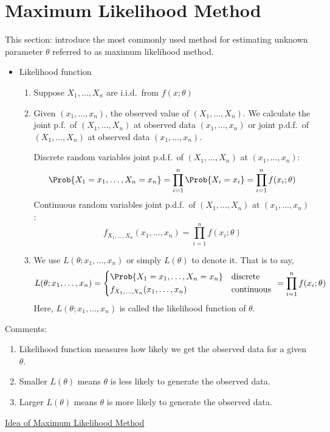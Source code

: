 \section{Maximum Likelihood Method}
This section: introduce the most commonly used method for estimating unknown
parameter $ \theta $ referred to as maximum likelihood method.
\begin{itemize}
    \item Likelihood function
          \begin{enumerate}
              \item Suppose $ X_1,\ldots,X_n $ are i.i.d.\ from $ f(x;\theta) $
              \item Given $ (x_1,\ldots,x_n) $, the observed value of $ (X_1,\ldots,X_n) $.
                    We calculate the joint p.f.\ of $ (X_1,\ldots,X_n) $ at observed
                    data $ (x_1,\ldots,x_n) $ or joint p.d.f.\ of $ (X_1,\ldots,X_n) $
                    at observed data $ (x_1,\ldots,x_n) $.

                    Discrete random variables joint p.d.f.\ of $ (X_1,\ldots,X_n) $
                    at $ (x_1,\ldots,x_n) $:
                    \[ \Prob{X_1=x_1,\ldots,X_n=x_n}=
                        \prod_{i=1}^n \Prob{X_i=x_i}=
                        \prod_{i=1}^n f(x_i;\theta) \]
                    Continuous random variables joint p.d.f.\ of $ (X_1,\ldots,X_n) $
                    at $ (x_1,\ldots,x_n) $:
                    \[ f_{X_1,\ldots,X_n}(x_1,\ldots,x_n)=
                        \prod_{i=1}^n f(x_i;\theta) \]
              \item We use $ L(\theta;x_1,\ldots,x_n) $ or simply
                    $ L(\theta) $ to denote it. That is to say,
                    \[ L(\theta;x_1,\ldots,x_n)=
                        \begin{cases*}
                            \Prob{X_1=x_1,\ldots,X_n=x_n} & discrete\\
                            f_{X_1,\ldots,X_n}(x_1,\ldots,x_n) & continuous
                        \end{cases*}=\prod_{i=1}^n f(x_i;\theta) \]
                    Here, $ L(\theta;x_1,\ldots,x_n) $ is called the likelihood function
                    of $ \theta $.
          \end{enumerate}
\end{itemize}
Comments:
\begin{enumerate}
    \item Likelihood function measures how likely we get
          the observed data for a given $ \theta $.
    \item Smaller $ L(\theta) $ means $ \theta $ is less likely
          to generate the observed data.
    \item Larger $ L(\theta) $ means $ \theta $ is more likely
          to generate the observed data.
\end{enumerate}
\underline{Idea of Maximum Likelihood Method}

